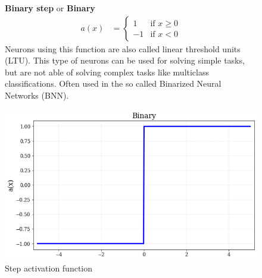 \begin{figure}[!h]
\begin{minipage}{0.5\textwidth}
    \textbf{Binary step} or \textbf{Binary}
      \begin{align}
        a(x) &=
        \begin{cases}
        1   & \text{if } x \geq 0 \\
        -1  & \text{if } x < 0 
  \end{cases}
\end{align}
Neurons using this function are also called linear threshold units (LTU). This type of neurons can be used for solving simple tasks, but are not able of solving complex tasks like multiclass classifications. Often used in the so called Binarized Neural Networks (BNN).
\end{minipage}
\hfill
\begin{minipage}{0.45\textwidth}

    \centering
\includegraphics[width=\textwidth]{sections/03/Images/Binary.png}
\caption{Step activation function}
    \label{fig:act_step}
\end{minipage}
\end{figure}  


